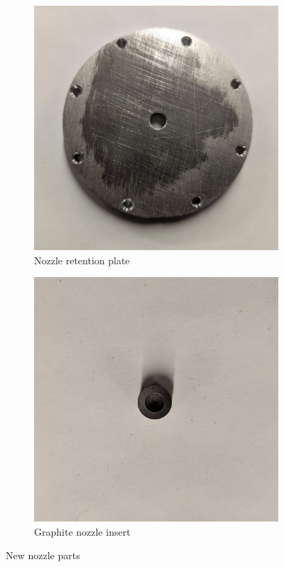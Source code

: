 \begin{figure}[!ht]
    \centering
    \begin{subfigure}[t]{0.45\textwidth}
        \centering
        \includegraphics[width=\textwidth]{assets/5 discussion/Nozzle plate.jpg}
        \caption{Nozzle retention plate}
        \label{fig:nozzle plate}
    \end{subfigure}
    \hfill
    \begin{subfigure}[t]{0.45\textwidth}
        \centering
        \includegraphics[width=\textwidth]{assets/5 discussion/Nozzle insert.jpg}
        \caption{Graphite nozzle insert}
        \label{fig:nozzle insert}
    \end{subfigure}
    \caption{New nozzle parts}
\end{figure}

